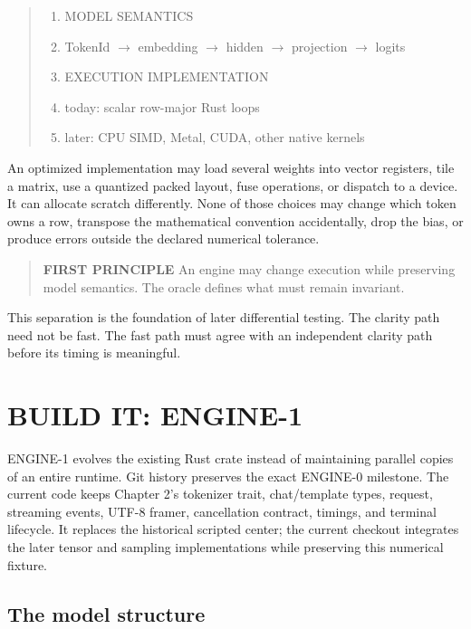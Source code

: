 \begin{quote}
\begin{enumerate}
\item MODEL SEMANTICS
\item TokenId  \(\longrightarrow\)  embedding  \(\longrightarrow\)  hidden  \(\longrightarrow\)  projection  \(\longrightarrow\)  logits
\item EXECUTION IMPLEMENTATION
\item today: scalar row-major Rust loops
\item later: CPU SIMD, Metal, CUDA, other native kernels
\end{enumerate}
\end{quote}

An optimized implementation may load several weights into vector
registers, tile a matrix, use a quantized packed layout, fuse
operations, or dispatch to a device. It can allocate scratch
differently. None of those choices may change which token owns a row,
transpose the mathematical convention accidentally, drop the bias, or
produce errors outside the declared numerical tolerance.

\begin{quote}
\textbf{FIRST PRINCIPLE} An engine may change execution while preserving
model semantics. The oracle defines what must remain invariant.
\end{quote}

This separation is the foundation of later differential testing. The
clarity path need not be fast. The fast path must agree with an
independent clarity path before its timing is meaningful.

\section{BUILD IT: ENGINE-1}\label{build-it-engine-1}

ENGINE-1 evolves the existing Rust crate instead of maintaining parallel
copies of an entire runtime. Git history preserves the exact ENGINE-0
milestone. The current code keeps Chapter 2's tokenizer trait,
chat/template types, request, streaming events, UTF-8 framer,
cancellation contract, timings, and terminal lifecycle. It replaces the
historical scripted center; the current checkout integrates the later tensor
and sampling implementations while preserving this numerical fixture.

\subsection{The model structure}\label{the-model-structure}

